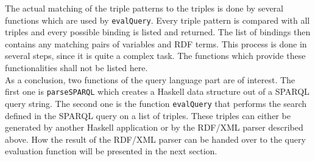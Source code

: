 \documentclass[11pt,a4paper,headsepline, bibtotoc]{scrreprt}
\begin{document}
The actual matching of the triple patterns to the triples is done by several functions which are used by \texttt{evalQuery}. Every triple pattern is compared with all triples and every possible binding is listed and returned. The list of bindings then contains any matching pairs of variables and RDF terms. This process is done in several steps, since it is quite a complex task. The functions which provide these functionalities shall not be listed here.\\
As a conclusion, two functions of the query language part are of interest. The first one is \texttt{parseSPARQL} which creates a Haskell data structure out of a SPARQL query string. The second one is the function \texttt{evalQuery} that performs the search defined in the SPARQL query on a list of triples. These triples can either be generated by another Haskell application or by the RDF/XML parser described above. How the result of the RDF/XML parser can be handed over to the query evaluation function will be presented in the next section.
\end{document}
